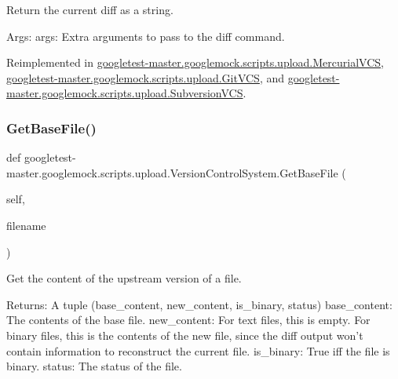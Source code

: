 \begin{DoxyVerb}Return the current diff as a string.

Args:
  args: Extra arguments to pass to the diff command.
\end{DoxyVerb}
 

Reimplemented in \mbox{\hyperlink{classgoogletest-master_1_1googlemock_1_1scripts_1_1upload_1_1_mercurial_v_c_s_ab14652e009f3489728caa983ad50b026}{googletest-\/master.\+googlemock.\+scripts.\+upload.\+Mercurial\+V\+CS}}, \mbox{\hyperlink{classgoogletest-master_1_1googlemock_1_1scripts_1_1upload_1_1_git_v_c_s_a397feccdaf8a14b5fa39e0911e40c282}{googletest-\/master.\+googlemock.\+scripts.\+upload.\+Git\+V\+CS}}, and \mbox{\hyperlink{classgoogletest-master_1_1googlemock_1_1scripts_1_1upload_1_1_subversion_v_c_s_aff69672a08c22f4c2ecc5b4469aa7a3f}{googletest-\/master.\+googlemock.\+scripts.\+upload.\+Subversion\+V\+CS}}.

\mbox{\label{classgoogletest-master_1_1googlemock_1_1scripts_1_1upload_1_1_version_control_system_af5a7da9e4adf46f51e6a3c077e36688d}} 
\subsubsection{\texorpdfstring{GetBaseFile()}{GetBaseFile()}}
{\footnotesize\ttfamily def googletest-\/master.\+googlemock.\+scripts.\+upload.\+Version\+Control\+System.\+Get\+Base\+File (\begin{DoxyParamCaption}\item[{}]{self,  }\item[{}]{filename }\end{DoxyParamCaption})}

\begin{DoxyVerb}Get the content of the upstream version of a file.

Returns:
  A tuple (base_content, new_content, is_binary, status)
base_content: The contents of the base file.
new_content: For text files, this is empty.  For binary files, this is
  the contents of the new file, since the diff output won't contain
  information to reconstruct the current file.
is_binary: True iff the file is binary.
status: The status of the file.
\end{DoxyVerb}
 

